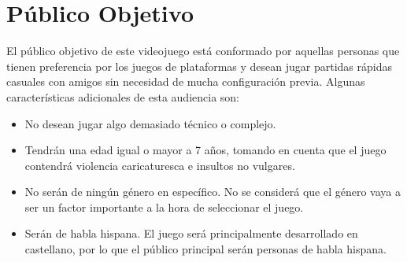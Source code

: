 \section{P\'ublico Objetivo}

El público objetivo de este videojuego está conformado por aquellas personas que
tienen preferencia por los juegos de plataformas y desean jugar partidas rápidas
casuales con amigos sin necesidad de mucha configuración previa. Algunas
características adicionales de esta audiencia son:

\begin{itemize}
    \item No desean jugar algo demasiado técnico o complejo.
    \item Tendrán una edad igual o mayor a 7 años, tomando en cuenta que el
    juego contendrá violencia caricaturesca e insultos no vulgares.
    \item No serán de ningún género en específico. No se considerá que el género
    vaya a ser un factor importante a la hora de seleccionar el juego.
    \item Serán de habla hispana. El juego será principalmente desarrollado en
    castellano, por lo que el público principal serán personas de habla hispana.
\end{itemize}
